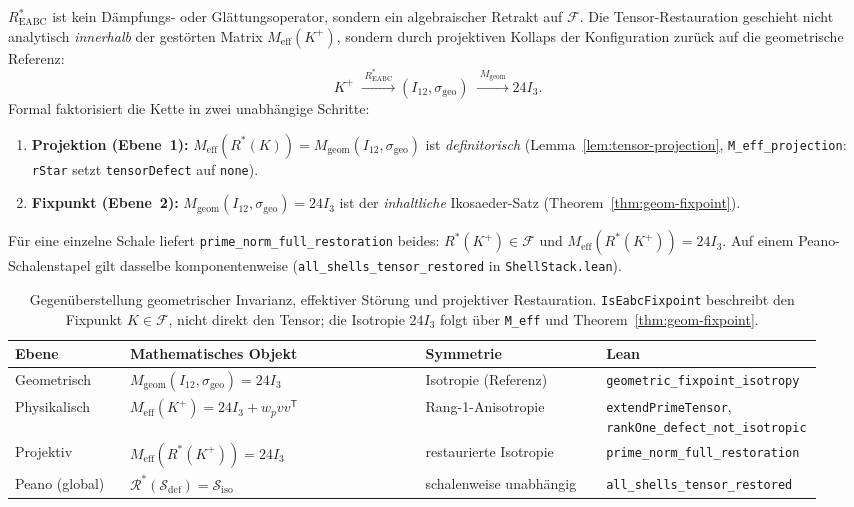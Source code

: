 \documentclass[11pt,a4paper]{article}
\begin{document}
$R^*_{\mathrm{EABC}}$ ist kein Dämpfungs- oder Glättungsoperator, sondern ein
algebraischer Retrakt auf $\mathcal{F}$.
Die Tensor-Restauration geschieht nicht analytisch \emph{innerhalb} der gestörten
Matrix $M_{\mathrm{eff}}(K^+)$, sondern durch projektiven Kollaps der Konfiguration
zurück auf die geometrische Referenz:
\[
  K^+
  \;\xrightarrow{\;R^*_{\mathrm{EABC}}\;}
  (I_{12},\sigma_{\mathrm{geo}})
  \;\xrightarrow{\;M_{\mathrm{geom}}\;}
  24I_3.
\]
Formal faktorisiert die Kette in zwei unabhängige Schritte:
\begin{enumerate}
\item \textbf{Projektion (Ebene~1):}
  $M_{\mathrm{eff}}(R^*(K))=M_{\mathrm{geom}}(I_{12},\sigma_{\mathrm{geo}})$
  ist \emph{definitorisch}
  (Lemma~\ref{lem:tensor-projection}, \texttt{M\_eff\_projection}:
  \texttt{rStar} setzt \texttt{tensorDefect} auf \texttt{none}).
\item \textbf{Fixpunkt (Ebene~2):}
  $M_{\mathrm{geom}}(I_{12},\sigma_{\mathrm{geo}})=24I_3$
  ist der \emph{inhaltliche} Ikosaeder-Satz
  (Theorem~\ref{thm:geom-fixpoint}).
\end{enumerate}
Für eine einzelne Schale liefert \texttt{prime\_norm\_full\_restoration} beides:
$R^*(K^+)\in\mathcal{F}$ und $M_{\mathrm{eff}}(R^*(K^+))=24I_3$.
Auf einem Peano-Schalenstapel gilt dasselbe komponentenweise
(\texttt{all\_shells\_tensor\_restored} in \texttt{ShellStack.lean}).

\begin{table}[h!]
\centering
\small
\begin{tabular}{p{0.14\linewidth}p{0.36\linewidth}p{0.22\linewidth}p{0.22\linewidth}}
\hline
\textbf{Ebene} & \textbf{Mathematisches Objekt} & \textbf{Symmetrie} & \textbf{Lean} \\
\hline
Geometrisch &
  $M_{\mathrm{geom}}(I_{12},\sigma_{\mathrm{geo}})=24I_3$ &
  Isotropie (Referenz) &
  \texttt{geometric\_fixpoint\_isotropy} \\
Physikalisch &
  $M_{\mathrm{eff}}(K^+)=24I_3+w_pvv^{\mathsf T}$ &
  Rang-1-Anisotropie &
  \texttt{extendPrimeTensor}, \texttt{rankOne\_defect\_not\_isotropic} \\
Projektiv &
  $M_{\mathrm{eff}}(R^*(K^+))=24I_3$ &
  restaurierte Isotropie &
  \texttt{prime\_norm\_full\_restoration} \\
Peano (global) &
  $\mathcal{R}^*(\mathcal{S}_{\mathrm{def}})=\mathcal{S}_{\mathrm{iso}}$ &
  schalenweise unabhängig &
  \texttt{all\_shells\_tensor\_restored} \\
\hline
\end{tabular}
\caption{Gegenüberstellung geometrischer Invarianz, effektiver Störung und projektiver Restauration.
\texttt{IsEabcFixpoint} beschreibt den Fixpunkt $K\in\mathcal{F}$, nicht direkt den Tensor;
die Isotropie $24I_3$ folgt über \texttt{M\_eff} und Theorem~\ref{thm:geom-fixpoint}.}
\label{tab:two-levels}
\end{table}
\end{document}
